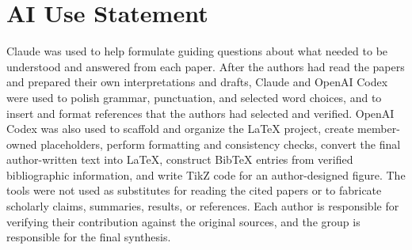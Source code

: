 \section*{AI Use Statement}

Claude was used to help formulate guiding questions about what needed to be
understood and answered from each paper. After the authors had read the papers
and prepared their own interpretations and drafts, Claude and OpenAI Codex were
used to polish grammar, punctuation, and selected word choices, and to insert
and format references that the authors had selected and verified. OpenAI Codex
was also used to scaffold and organize the LaTeX project, create member-owned
placeholders, perform formatting and consistency checks, convert the final
author-written text into LaTeX, construct BibTeX entries from verified
bibliographic information, and write TikZ code for an author-designed figure.
The tools were not used as substitutes for reading the cited papers or to
fabricate scholarly claims, summaries, results, or references. Each author is
responsible for verifying their contribution against the original sources, and
the group is responsible for the final synthesis.
